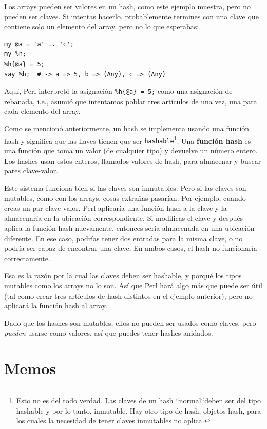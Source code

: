 Los arrays pueden ser valores en un hash, como este ejemplo muestra, pero
no pueden ser claves. Si intentas hacerlo, probablemente termines con una clave
que contiene solo un elemento del array, pero no lo que esperabas:

\begin{verbatim}
my @a = 'a' .. 'c';
my %h;
%h{@a} = 5;
say %h;  # -> a => 5, b => (Any), c => (Any)
\end{verbatim}

Aquí, Perl interpretó la asignación \verb|%h{@a} = 5;|
como una asignación de rebanada, i.e., asumió que intentamos
poblar tres artículos de una vez, una para cada elemento del
array.


Como se mencionó anteriormente, un hash se implementa usando 
una función hash y significa que las llaves tienen
que ser {\tt hashable}\footnote{Esto no es del todo verdad.
Las claves de un hash ``normal``deben ser del tipo hashable
y por lo tanto, inmutable. Hay otro tipo de hash, objetos hash,
para los cuales la necesidad de tener claves inmutables no aplica.}.
Una {\bf función hash} es una función que toma un valor (de cualquier tipo)
y devuelve un número entero. Los hashes usan estos enteros, llamados valores
de hash, para almacenar y buscar pares clave-valor.

Este sistema funciona bien si las claves son inmutables. Pero si las claves
son mutables, como con los arrays, cosas extrañas pasarían. Por ejemplo,
cuando creas un par clave-valor, Perl aplicaría una función hash a la clave
y la almacenaría en la ubicación correspondiente. Si modificas el clave y después
aplica la función hash nuevamente, entonces sería almacenada en una ubicación
diferente. En ese caso, podrías tener dos entradas para la misma clave, o 
no podría ser capaz de encontrar una clave. En ambos casos, el hash
no funcionaría correctamente.

Esa es la razón por la cual las claves deben ser hashable, y porqué
los tipos mutables como los arrays no lo son. Así que Perl hará algo más 
que puede ser útil (tal como crear tres artículos de hash distintos en el
ejemplo anterior), pero no aplicará la función hash al array. 
  
Dado que los hashes son mutables, ellos no pueden ser usados como claves,
pero {\em pueden} usarse como valores, así que puedes tener hashes anidados.

\section{Memos}
\label{memoize}

